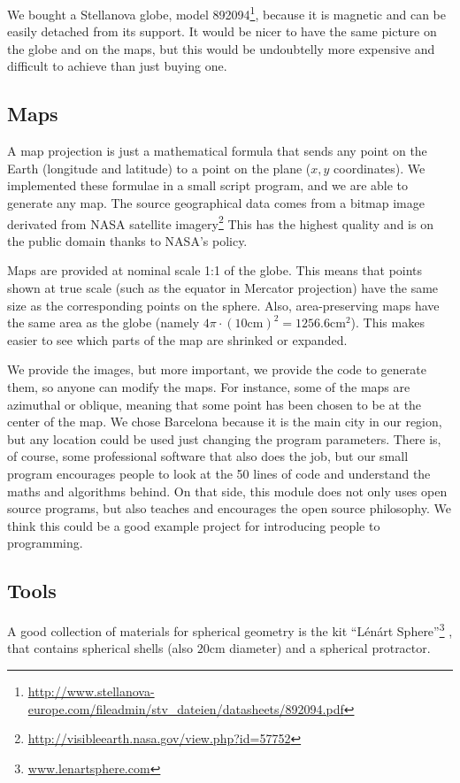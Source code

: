 \documentclass[a4paper,12pt]{article}
\begin{document}
We bought a Stellanova globe, model 892094\footnote{\url{http://www.stellanova-europe.com/fileadmin/stv_dateien/datasheets/892094.pdf}},
because it is magnetic and can be easily detached from its support. It would be nicer to have the same picture on the globe and on the maps,
but this would be undoubtelly more expensive and difficult to achieve than just buying one.

\subsection{Maps}
A map projection is just a mathematical formula that sends any point on the Earth (longitude and latitude) to a point on the plane ($x,y$
coordinates). We implemented these formulae in a small script program, and we are able to generate any map. The source geographical data
comes from a bitmap image derivated from NASA satellite imagery\footnote{\url{http://visibleearth.nasa.gov/view.php?id=57752}} This has the
highest quality and is on the public domain thanks to NASA's policy. 

Maps are provided at nominal scale 1:1 of the globe. This means that points shown at true scale (such as the equator in Mercator projection) have the same size as the corresponding points on the sphere. Also, area-preserving maps have the same area as the globe (namely $4\pi\cdot (10\mathrm{cm})^2 = 1256.6 \mathrm{cm}^2$). This makes easier to see which parts of the map are shrinked or expanded. 

We provide the images, but more important, we provide the code to generate them, so anyone can modify the maps. For instance, some of the maps are azimuthal or oblique, meaning that some point has been chosen to be at the center of the map. We chose Barcelona because it is the main city in our region, but any location could be used just changing the program parameters. There is, of course, some professional software that also does the job, but our small program encourages people to look at the 50 lines of code and understand the maths and algorithms behind. On that side, this module does not only uses open source programs, but also teaches and encourages the open source philosophy. We think this could be a good example project for introducing people to programming.

\subsection{Tools}
A good collection of materials for spherical geometry is the kit ``Lénárt Sphere''\footnote{\url{www.lenartsphere.com}} , that contains
spherical shells (also $20\mathrm{cm}$ diameter) and a spherical protractor. 
\end{document}

